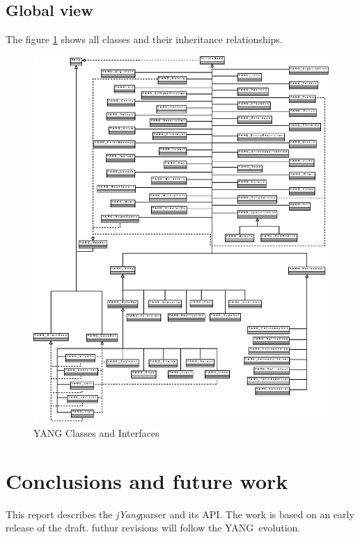 \documentclass[a4paper]{article}
\newcommand{\jyang}{{\sl jYang}}
\newcommand{\y}{YANG}
\begin{document}
\subsection{Global view}

The  figure  \ref{global}  shows  all classes  and  their  inheritance
relationships.

\begin{figure}[htbp]
\begin{center}
\includegraphics[scale = 1]{SimpleNodeHierarchy.eps}
\end{center}
\caption{YANG Classes and Interfaces}
\label{global}
\end{figure}

\section{Conclusions and future work}

This report describes the \jyang parser and its API. The work is based
on an early release of the draft\cite{yang01}. futhur revisions will
follow the \y\ evolution.
\end{document}
